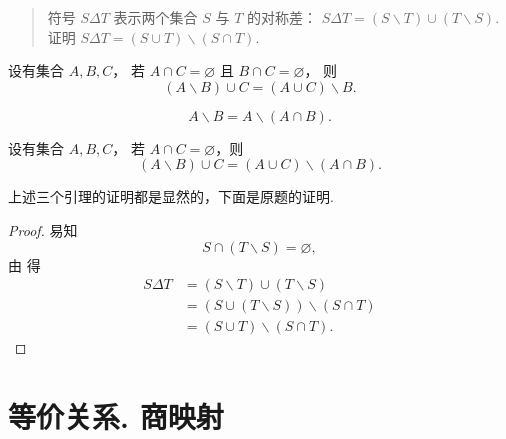 \begin{quotation}
    符号 $S \Delta T$ 表示两个集合 $S$ 与 $T$ 的对称差：
    $S \Delta T = (S \backslash T)\cup(T \backslash S).$
    证明 $S \Delta T = (S \cup T)\backslash(S \cap T).$
\end{quotation}
\begin{lemma}\label{lem:ch01:sec05:4}
    设有集合 $A, B, C$，
    若 $A \cap C = \varnothing$ 且 $B \cap C = \varnothing$，
    则
    \[
        (A \backslash B) \cup C = (A \cup C) \backslash B.
    \]
\end{lemma}
\begin{lemma}
    \[
        A \backslash B = A \backslash (A \cap B).
    \]
\end{lemma}
\begin{lemma}\label{lem:ch01:sec05:3}
    设有集合 $A, B, C$，
    若 $A \cap C = \varnothing$，则
    \[
        (A \backslash B) \cup C = (A \cup C)\backslash(A \cap B).
    \]
\end{lemma}

上述三个引理的证明都是显然的，下面是原题的证明.
\begin{proof}

    易知
    \begin{equation}
        S \cap (T \backslash S) = \varnothing,
    \end{equation}
    由 得
    \begin{equation}
    \begin{aligned}
        S \Delta T &= (S \backslash T)\cup(T \backslash S) \\
        & = (S \cup (T \backslash S)) \backslash (S \cap T) \\
        & = (S \cup T) \backslash (S \cap T).
    \end{aligned}
    \end{equation}
\end{proof}


\section{等价关系. 商映射} %

